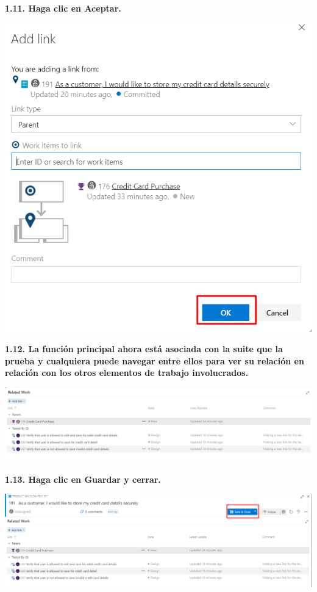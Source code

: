 \documentclass{article}
\begin{document}
\textbf{1.11. 
Haga clic en Aceptar.}

    \begin{center}
		\includegraphics[width=14cm]{./images/1.11} 
	\end{center}

\newpage
	
\textbf{1.12. La función principal ahora está asociada con la suite que la prueba y cualquiera puede navegar entre ellos para ver su relación en relación con los otros elementos de trabajo involucrados.}

    \begin{center}
		\includegraphics[width=14cm]{./images/1.12} 
	\end{center}

\textbf{1.13. Haga clic en Guardar y cerrar.}

    \begin{center}
		\includegraphics[width=14cm]{./images/1.13} 
	\end{center}
	
\end{document}
